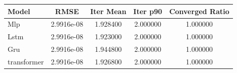 \begin{tabular}{lcccc}
\toprule
Model & RMSE & Iter Mean & Iter p90 & Converged Ratio \\
\midrule
Mlp & 2.9916e-08 & 1.928400 & 2.000000 & 1.000000 \\
Lstm & 2.9916e-08 & 1.923000 & 2.000000 & 1.000000 \\
Gru & 2.9916e-08 & 1.944800 & 2.000000 & 1.000000 \\
transformer & 2.9916e-08 & 1.926800 & 2.000000 & 1.000000 \\
\bottomrule
\end{tabular}
